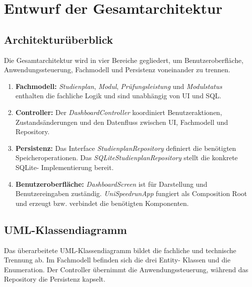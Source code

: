 \documentclass[11pt,a4paper]{article}
\begin{document}
\section{Entwurf der Gesamtarchitektur}

\subsection{Architekturüberblick}

Die Gesamtarchitektur wird in vier Bereiche gegliedert, um
Benutzeroberfläche, Anwendungssteuerung, Fachmodell und Persistenz
voneinander zu trennen.

\begin{enumerate}
    \item
    \textbf{Fachmodell:}
    \textit{Studienplan}, \textit{Modul},
    \textit{Prüfungsleistung} und \textit{Modulstatus} enthalten die
    fachliche Logik und sind unabhängig von UI und SQL.

    \item
    \textbf{Controller:}
    Der \textit{DashboardController} koordiniert Benutzeraktionen,
    Zustandsänderungen und den Datenfluss zwischen UI, Fachmodell und
    Repository.

    \item
    \textbf{Persistenz:}
    Das Interface \textit{StudienplanRepository} definiert die
    benötigten Speicheroperationen. Das
    \textit{SQLiteStudienplanRepository} stellt die konkrete SQLite-
    Implementierung bereit.

    \item
    \textbf{Benutzeroberfläche:}
    \textit{DashboardScreen} ist für Darstellung und
    Benutzereingaben zuständig. \textit{UniSpeedrunApp} fungiert als
    Composition Root und erzeugt bzw. verbindet die benötigten
    Komponenten.
\end{enumerate}

\subsection{UML-Klassendiagramm}

Das überarbeitete UML-Klassendiagramm bildet die fachliche und
technische Trennung ab. Im Fachmodell befinden sich die drei Entity-
Klassen und die Enumeration. Der Controller übernimmt die
Anwendungssteuerung, während das Repository die Persistenz kapselt.
\end{document}
